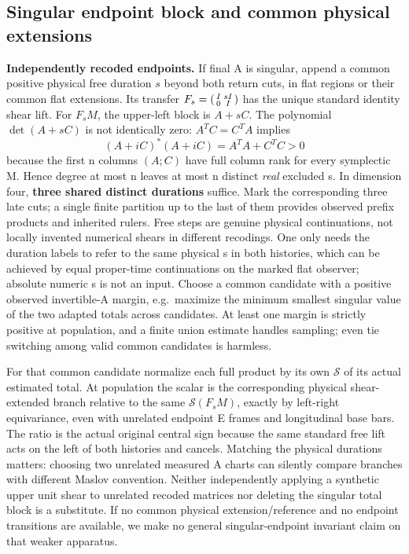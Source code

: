 \documentclass[11pt]{article}
\begin{document}
\subsection{Singular endpoint block and common physical extensions}\label{singular-endpoint-block-and-common-physical-extensions}

\textbf{Independently recoded endpoints.} If final A is singular, append a common positive physical free duration \(s\) beyond both return cuts, in flat regions or their common flat extensions. Its transfer \(F_s=\begin{psmallmatrix}I&sI\\0&I\end{psmallmatrix}\) has the unique standard identity shear lift. For \(F_s M\), the upper-left block is \(A+sC\). The polynomial \(\det(A+sC)\) is not identically zero: \(A^TC=C^TA\) implies
\[
 (A+iC)^*(A+iC)=A^TA+C^TC>0
\]
because the first n columns \((A;C)\) have full column rank for every symplectic M. Hence degree at most n leaves at most n distinct \emph{real} excluded s. In dimension four, \textbf{three shared distinct durations} suffice. Mark the corresponding three late cuts; a single finite partition up to the last of them provides observed prefix products and inherited rulers. Free steps are genuine physical continuations, not locally invented numerical shears in different recodings. One only needs the duration labels to refer to the same physical s in both histories, which can be achieved by equal proper-time continuations on the marked flat observer; absolute numeric s is not an input. Choose a common candidate with a positive observed invertible-A margin, e.g.~maximize the minimum smallest singular value of the two adapted totals across candidates. At least one margin is strictly positive at population, and a finite union estimate handles sampling; even tie switching among valid common candidates is harmless.

For that common candidate normalize each full product by its own \(\mathcal S\) of its actual estimated total. At population the scalar is the corresponding physical shear-extended branch relative to the same \(\mathcal S(F_s M)\), exactly by left-right equivariance, even with unrelated endpoint E frames and longitudinal base bars. The ratio is the actual original central sign because the same standard free lift acts on the left of both histories and cancels. Matching the physical durations matters: choosing two unrelated measured A charts can silently compare branches with different Maslov convention. Neither independently applying a synthetic upper unit shear to unrelated recoded matrices nor deleting the singular total block is a substitute. If no common physical extension/reference and no endpoint transitions are available, we make no general singular-endpoint invariant claim on that weaker apparatus.
\end{document}
